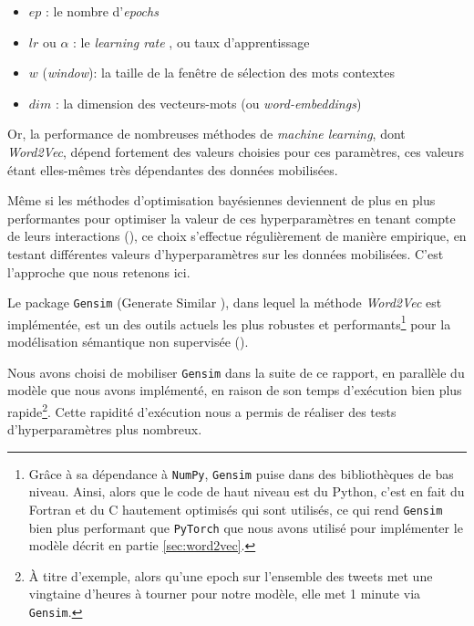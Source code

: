 \documentclass[11pt,french,french]{article}
\let\rmarkdownfootnote\footnote%
\def\footnote{\protect\rmarkdownfootnote}
\begin{document}
\begin{itemize}
\item $ep$ : le nombre d'\og \emph{epochs} \fg{}
\item $lr$ ou $\alpha$ : le \og \emph{learning rate} \fg{}, ou taux d'apprentissage
\item $w$ (\emph{window}): la taille de la fenêtre de sélection des mots contextes
\item $dim$ : la dimension des vecteurs-mots (ou \emph{word-embeddings})
\end{itemize}

Or, la performance de nombreuses méthodes de \emph{machine learning},
dont \emph{Word2Vec}, dépend fortement des valeurs choisies pour ces
paramètres, ces valeurs étant elles-mêmes très dépendantes des données
mobilisées.

Même si les méthodes d'optimisation bayésiennes deviennent de plus en
plus performantes pour optimiser la valeur de ces hyperparamètres en
tenant compte de leurs interactions (\cite{Hutter}), ce choix s'effectue
régulièrement de manière empirique, en testant différentes valeurs
d'hyperparamètres sur les données mobilisées. C'est l'approche que nous
retenons ici.

Le package \texttt{Gensim} (\og Generate Similar \fg{}), dans lequel la
méthode \emph{Word2Vec} est implémentée, est un des outils actuels les
plus robustes et performants\footnote{Grâce à sa dépendance à
  \texttt{NumPy}, \texttt{Gensim} puise dans des bibliothèques de bas
  niveau. Ainsi, alors que le code de haut niveau est du Python, c'est
  en fait du Fortran et du C hautement optimisés qui sont utilisés, ce
  qui rend \texttt{Gensim} bien plus performant que \texttt{PyTorch} que
  nous avons utilisé pour implémenter le modèle décrit en partie
  \ref{sec:word2vec}.} pour la modélisation sémantique non supervisée
(\cite{Rehurek}).

Nous avons choisi de mobiliser \texttt{Gensim} dans la suite de ce
rapport, en parallèle du modèle que nous avons implémenté, en raison de
son temps d'exécution bien plus rapide\footnote{À titre d'exemple, alors
  qu'une epoch sur l'ensemble des tweets met une vingtaine d'heures à
  tourner pour \og notre \fg{} modèle, elle met 1 minute via
  \texttt{Gensim}.}. Cette rapidité d'exécution nous a permis de
réaliser des tests d'hyperparamètres plus nombreux.
\end{document}

